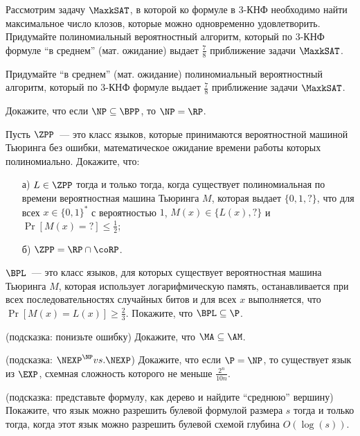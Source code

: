 
\begin{task}
    Рассмотрим задачу $\MaxkSAT$, в которой ко формуле в $3$-КНФ необходимо найти максимальное число клозов, которые можно
    одновременно удовлетворить. Придумайте полиномиальный вероятностный алгоритм, который по $3$-КНФ формуле ``в среднем''
    (мат. ожидание) выдает $\frac{7}{8}$ приближение задачи $\MaxkSAT$.
\end{task}

\begin{task}
	Придумайте ``в среднем'' (мат. ожидание) полиномиальный вероятностный алгоритм, который по $3$-КНФ формуле выдает
    $\frac{7}{8}$ приближение задачи $\MaxkSAT$.
\end{task}

\begin{task}
    Докажите, что если $\NP \subseteq \BPP$, то $\NP = \RP$.
\end{task}


\begin{task}
    Пусть $\ZPP$~--- это класс языков, которые принимаются вероятностной машиной Тьюринга без ошибки, математическое ожидание
    времени работы которых полиномиально. Докажите, что:
    \begin{enumerate}[topsep = 0pt, itemsep = -1ex]
        \item [а)] $L \in \ZPP$ тогда и только тогда, когда существует полиномиальная по времени вероятностная машина Тьюринга
			$M$, которая выдает $\{0, 1, ?\}$, что для всех $x \in \{0, 1\}^*$ с вероятностью $1$, $M(x) \in \{L(x), ?\}$ и 
            $\Pr[M(x) = {?}] \le \frac{1}{2}$;
        \item [б)] $\ZPP = \RP \cap \coRP$.
    \end{enumerate}
\end{task}

\begin{task}
    $\BPL$~--- это класс языков, для которых существует вероятностная машина Тьюринга $M$, которая использует логарифмическую
    память, останавливается при всех последовательностях случайных битов и для всех $x$ выполняется, что $\Pr[M(x) = L(x)] \ge
    \frac{2}{3}$. Покажите, что $\BPL \subseteq \P$. 
\end{task}


\begin{task}(подсказка: понизьте ошибку)
	Докажите, что $\MA \subseteq \AM$.
\end{task}



\breakline

\begin{ptask}{26}(подсказка: $\NEXP^{\NP} vs. \NEXP$)
    Докажите, что если $\P = \NP$, то существует язык из $\EXP$, схемная сложность которого не меньше $\frac{2^n}{10 n}$.
\end{ptask}

\begin{ptask}{37} (подсказка: представьте формулу, как дерево и найдите ``среднюю'' вершину)
    Покажите, что язык можно разрешить булевой формулой размера $s$ тогда и только тогда, когда этот язык можно разрешить булевой
    схемой глубина $O(\log(s))$.
\end{ptask}


